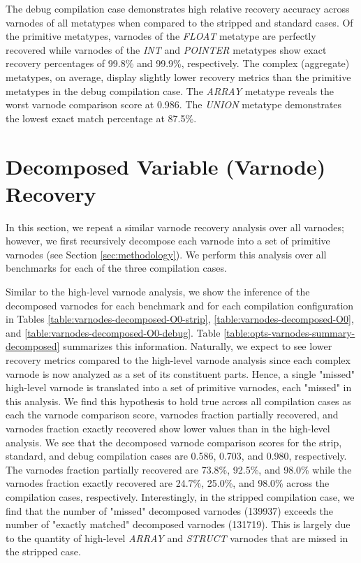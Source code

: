 The debug compilation case demonstrates high relative recovery accuracy across varnodes of all metatypes when compared to the stripped and standard cases. Of the primitive metatypes, varnodes of the \emph{FLOAT} metatype are perfectly recovered while varnodes of the \emph{INT} and \emph{POINTER} metatypes show exact recovery percentages of 99.8\% and 99.9\%, respectively. The complex (aggregate) metatypes, on average, display slightly lower recovery metrics than the primitive metatypes in the debug compilation case. The \emph{ARRAY} metatype reveals the worst varnode comparison score at 0.986. The \emph{UNION} metatype demonstrates the lowest exact match percentage at 87.5\%.

\section{Decomposed Variable (Varnode) Recovery}

In this section, we repeat a similar varnode recovery analysis over all varnodes; however, we first recursively decompose each varnode into a set of primitive varnodes (see Section \ref{sec:methodology}). We perform this analysis over all benchmarks for each of the three compilation cases.



Similar to the high-level varnode analysis, we show the inference of the decomposed varnodes for each benchmark and for each compilation configuration in Tables \ref{table:varnodes-decomposed-O0-strip}, \ref{table:varnodes-decomposed-O0}, and \ref{table:varnodes-decomposed-O0-debug}. Table \ref{table:opts-varnodes-summary-decomposed} summarizes this information. Naturally, we expect to see lower recovery metrics compared to the high-level varnode analysis since each complex varnode is now analyzed as a set of its constituent parts. Hence, a single "missed" high-level varnode is translated into a set of primitive varnodes, each "missed" in this analysis. We find this hypothesis to hold true across all compilation cases as each the varnode comparison score, varnodes fraction partially recovered, and varnodes fraction exactly recovered show lower values than in the high-level analysis. We see that the decomposed varnode comparison scores for the strip, standard, and debug compilation cases are 0.586, 0.703, and 0.980, respectively. The varnodes fraction partially recovered are 73.8\%, 92.5\%, and 98.0\% while the varnodes fraction exactly recovered are 24.7\%, 25.0\%, and 98.0\% across the compilation cases, respectively. Interestingly, in the stripped compilation case, we find that the number of "missed" decomposed varnodes (139937) exceeds the number of "exactly matched" decomposed varnodes (131719). This is largely due to the quantity of high-level \emph{ARRAY} and \emph{STRUCT} varnodes that are missed in the stripped case.

